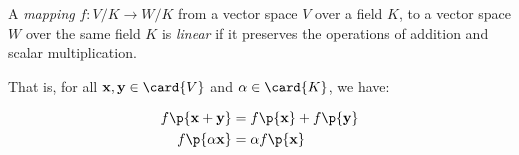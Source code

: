 \begin{definition}

A \emph{mapping} $f: V/K \rightarrow W/K$ from a vector space $V$ over a field
$K$, to a vector space $W$ over the same field $K$ is \emph{linear} if it
preserves the operations of addition and scalar multiplication.

That is, for all $\mathbf{x}, \mathbf{y} \in \card{V}$ and $\alpha \in
\card{K}$, we have:

\begin{align}
f\p{\mathbf{x}+\mathbf{y}} &= f\p{\mathbf{x}} + f\p{\mathbf{y}}\\
f\p{\alpha \mathbf{x}} &= \alpha f\p{\mathbf{x}}
\end{align}

\end{definition}
